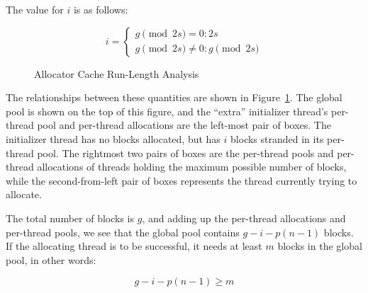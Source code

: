 {{	The value for $i$ is as follows:

	\begin{equation}
		i = \left \{
			\begin{array}{l}
				g \pmod{2 s} = 0: 2 s \\
				g \pmod{2 s} \ne 0: g \pmod{2 s}
			\end{array}
		    \right .
	\label{sec:SMPdesign:i}
	\end{equation}

	\begin{figure}[tb]
	\centering
	\caption{Allocator Cache Run-Length Analysis}
	\label{fig:SMPdesign:Allocator Cache Run-Length Analysis}
	\end{figure}

	The relationships between these quantities are shown in
	Figure~\ref{fig:SMPdesign:Allocator Cache Run-Length Analysis}.
	The global pool is shown on the top of this figure, and
	the ``extra'' initializer thread's per-thread pool and
	per-thread allocations are the left-most pair of boxes.
	The initializer thread has no blocks allocated, but has
	$i$ blocks stranded in its per-thread pool.
	The rightmost two pairs of boxes are the per-thread pools and
	per-thread allocations of threads holding the maximum possible
	number of blocks, while the second-from-left pair of boxes
	represents the thread currently trying to allocate.

	The total number of blocks is $g$, and adding up the per-thread
	allocations and per-thread pools, we see that the global pool
	contains $g-i-p(n-1)$ blocks.
	If the allocating thread is to be successful, it needs at least
	$m$ blocks in the global pool, in other words:

	\begin{equation}
		g - i - p(n - 1) \ge m
	\label{sec:SMPdesign:g-vs-m}
	\end{equation}

}}
